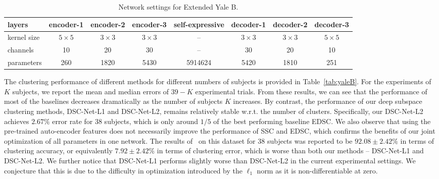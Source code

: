 \documentclass{article}
\begin{document}
\begin{table}[!t]
\centering
\footnotesize
\hspace*{-0.1cm}\begin{tabular}{ | l | c  c  c  c  c  c c | }
\hline
  layers      & encoder-1   & encoder-2  &  encoder-3 & self-expressive & decoder-1  & decoder-2   & decoder-3 \\            
  \hline
kernel size  & $5\times 5$ & $3\times 3$ & $3\times 3$ & -- & $3\times 3$  & $3\times 3$   & $5\times 5$  \\  
channels&  10         &  20         &   30        & -- & 30           &  20           & 10 \\
parameters& 260     & 1820   & 5430   & 5914624  & 5420  & 1810 & 251 \\
\hline
\end{tabular}
\caption{Network settings for Extended Yale B.}
\label{tab:struct-yaleb}
\vspace{-0.7cm}
\end{table}

The clustering performance of different methods for different numbers of subjects is provided in Table~\ref{tab:yaleB}. For the experiments of $K$ subjects, we report the mean and median errors of $39-K$ experimental trials. From these results, we can see that the performance of most of the baselines decreases dramatically as the number of subjects $K$ increases. By contrast, the performance of our deep subspace clustering methods, DSC-Net-L1 and DSC-Net-L2, remains relatively stable w.r.t. the number of clusters. Specifically, our DSC-Net-L2 achieves $2.67\%$ error rate for 38 subjects, which is only around $1/5$ of the best performing baseline EDSC. We also observe that using the pre-trained auto-encoder features does not necessarily improve the performance of SSC and EDSC, which confirms the benefits of our joint optimization of all parameters in one network. The results of~\cite{peng2016deep} on this dataset for 38 subjects was reported to be $92.08 \pm 2.42 \%$ in terms of clustering accuracy, or equivalently $7.92 \pm 2.42 \%$ in terms of clustering error, which is worse than both our methods -- DSC-Net-L1 and DSC-Net-L2. We further notice that DSC-Net-L1 performs slightly worse than DSC-Net-L2 in the current experimental settings. We conjecture that this is due to the difficulty in optimization introduced by the $\ell_1$ norm as it is non-differentiable at zero. 
\end{document}
